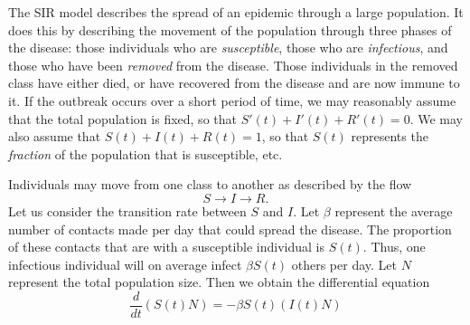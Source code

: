 %
%
%
%
%
%
%
%
The SIR model describes the spread of an epidemic through a large population.
It does this by describing the movement of the population through three phases of the disease: those individuals who are \emph{susceptible}, those who are \emph{infectious}, and those who have been \emph{removed} from the disease.
Those individuals in the removed class have either died, or have recovered from the disease and are now immune to it.
If the outbreak occurs over a short period of time, we may reasonably assume that the total population is fixed, so that $S'(t) + I'(t) + R'(t) = 0$.
We may also assume that $S(t) + I(t) + R(t) = 1$, so that $S(t)$ represents the \textit{fraction} of the population that is susceptible, etc.

Individuals may move from one class to another as described by the flow
\[S \to I \to R.\]
Let us consider the transition rate between $S$ and $I $.
Let $\beta$ represent the average number of contacts made per day that could spread the disease.
The proportion of these contacts that are with a susceptible individual is $S(t)$.
Thus, one infectious individual will on average infect $\beta S(t)$ others per day.
Let $N$ represent the total population size.
Then we obtain the differential equation
\[\frac{d}{dt}(S(t) N) = -\beta S(t) (I(t) N)\]

